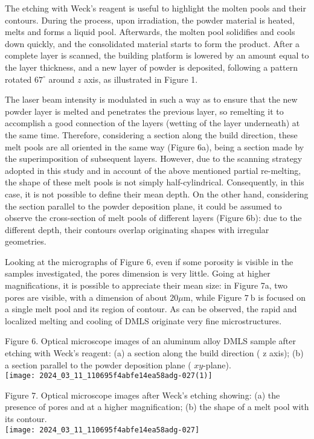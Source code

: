 \documentclass[10pt]{article}
\begin{document}
The etching with Weck's reagent is useful to highlight the molten pools and their contours. During the process, upon irradiation, the powder material is heated, melts and forms a liquid pool. Afterwards, the molten pool solidifies and cools down quickly, and the consolidated material starts to form the product. After a complete layer is scanned, the building platform is lowered by an amount equal to the layer thickness, and a new layer of powder is deposited, following a pattern rotated $67^{\circ}$ around $z$ axis, as illustrated in Figure 1.

The laser beam intensity is modulated in such a way as to ensure that the new powder layer is melted and penetrates the previous layer, so remelting it to accomplish a good connection of the layers (wetting of the layer underneath) at the same time. Therefore, considering a section along the build direction, these melt pools are all oriented in the same way (Figure 6a), being a section made by the superimposition of subsequent layers. However, due to the scanning strategy adopted in this study and in account of the above mentioned partial re-melting, the shape of these melt pools is not simply half-cylindrical. Consequently, in this case, it is not possible to define their mean depth. On the other hand, considering the section parallel to the powder deposition plane, it could be assumed to observe the cross-section of melt pools of different layers (Figure 6b): due to the different depth, their contours overlap originating shapes with irregular geometries.

Looking at the micrographs of Figure 6, even if some porosity is visible in the samples investigated, the pores dimension is very little. Going at higher magnifications, it is possible to appreciate their mean size: in Figure 7a, two pores are visible, with a dimension of about $20 \mu \mathrm{m}$, while Figure $7 \mathrm{~b}$ is focused on a single melt pool and its region of contour. As can be observed, the rapid and localized melting and cooling of DMLS originate very fine microstructures.

Figure 6. Optical microscope images of an aluminum alloy DMLS sample after etching with Weck's reagent: (a) a section along the build direction ( $\mathrm{z}$ axis); (b) a section parallel to the powder deposition plane ( $x y$-plane).\\
\texttt{[image: 2024\_03\_11\_110695f4abfe14ea58adg-027(1)]}

Figure 7. Optical microscope images after Weck's etching showing: (a) the presence of pores and at a higher magnification; (b) the shape of a melt pool with its contour.\\
\texttt{[image: 2024\_03\_11\_110695f4abfe14ea58adg-027]}
\end{document}
